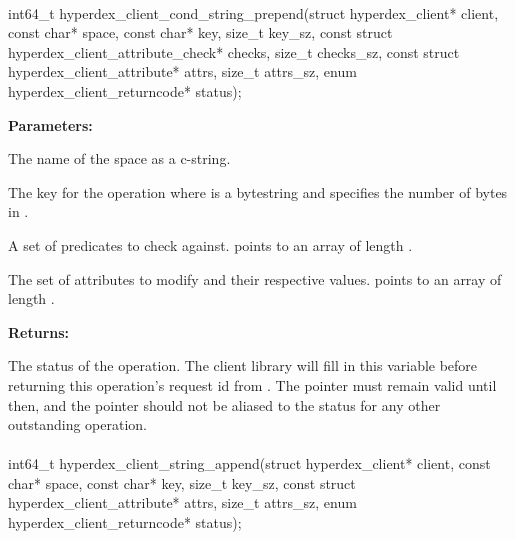 \paragraph{}
\begin{ccode}
int64_t hyperdex_client_cond_string_prepend(struct hyperdex_client* client,
                const char* space,
                const char* key, size_t key_sz,
                const struct hyperdex_client_attribute_check* checks, size_t checks_sz,
                const struct hyperdex_client_attribute* attrs, size_t attrs_sz,
                enum hyperdex_client_returncode* status);
\end{ccode}
\funcdesc 

\noindent\textbf{Parameters:}
\begin{description}[labelindent=\widthof{{\code{checks}, \code{checks\_sz}}},leftmargin=*,noitemsep,nolistsep,align=right]
\item[\code{space}] The name of the space as a c-string.
\item[\code{key}, \code{key\_sz}] The key for the operation where  is a bytestring and  specifies the number of bytes in .
\item[\code{checks}, \code{checks\_sz}] A set of predicates to check against.   points to an array of length .
\item[\code{attrs}, \code{attrs\_sz}] The set of attributes to modify and their respective values.   points to an array of length .
\end{description}

\noindent\textbf{Returns:}
\begin{description}[labelindent=\widthof{{\code{status}}},leftmargin=*,noitemsep,nolistsep,align=right]
\item[\code{status}] The status of the operation.  The client library will fill in this variable before returning this operation's request id from .  The pointer must remain valid until then, and the pointer should not be aliased to the status for any other outstanding operation.
\end{description}

\paragraph{}
\begin{ccode}
int64_t hyperdex_client_string_append(struct hyperdex_client* client,
                const char* space,
                const char* key, size_t key_sz,
                const struct hyperdex_client_attribute* attrs, size_t attrs_sz,
                enum hyperdex_client_returncode* status);
\end{ccode}
\funcdesc 

